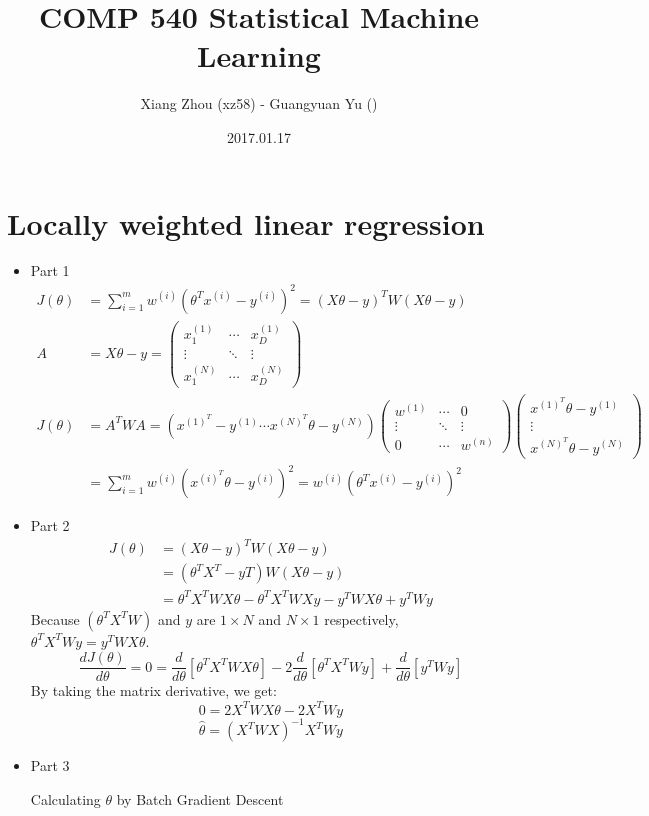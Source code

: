 \documentclass[pdftex,11pt]{article}
\begin{document}
\title{COMP 540 Statistical Machine Learning}
\author{Xiang Zhou (xz58) - Guangyuan Yu ()}
\date{2017.01.17}
\maketitle
\newcommand{\pr}{\mathbb{P}}
\section{Locally weighted linear regression}
\begin{itemize}
\item Part 1 \begin{align*}
	J(\theta)&=\sum^m_{i=1}w^{(i)}(\theta^Tx^{(i)}-y^{(i)})^2=(X\theta-y)^TW(X\theta-y)\\
	A&=X\theta-y=
	\begin{pmatrix}
		x_1^{(1)} & \cdots & x_D^{(1)}\\
		\vdots & \ddots & \vdots\\
		x_1^{(N)} & \cdots & x_D^{(N)}
	\end{pmatrix}\\
	J(\theta)&=A^TWA=(x^{(1)^T}-y^{(1)}\cdots x^{(N)^T}\theta-y^{(N)})
	\begin{pmatrix}
		w^{(1)} & \cdots & 0\\
		\vdots & \ddots & \vdots\\
		0 & \cdots & w^{(n)}
	\end{pmatrix}
	\begin{pmatrix}
		x^{(1)^T}\theta-y^{(1)}\\
		\vdots\\
		x^{(N)^T}\theta-y^{(N)}
	\end{pmatrix}\\
	&=\sum^m_{i=1}w^{(i)}(x^{(i)^T}\theta-y^{(i)})^2=w^{(i)}(\theta^Tx^{(i)}-y^{(i)})^2
	\end{align*}
\item Part 2 \begin{align*}
	J(\theta)&=(X\theta-y)^TW(X\theta-y)\\
	&=(\theta^TX^T-yT)W(X\theta-y)\\
	&=\theta^TX^TWX\theta-\theta^TX^TWXy-y^TWX\theta+y^TWy
	\end{align*}
	Because $(\theta^TX^TW)$ and $y$ are $1\times N$ and $N\times 1$ respectively, $\theta^TX^TWy=y^TWX\theta$.
	$$\frac{dJ(\theta)}{d\theta}=0=\frac{d}{d\theta}[\theta^TX^TWX\theta]-2\frac{d}{d\theta}[\theta^TX^TWy]+\frac{d}{d\theta}[y^TWy]$$
	By taking the matrix derivative, we get:
	$$0=2X^TWX\theta-2X^TWy$$
	$$\hat{\theta}=(X^TWX)^{-1}X^TWy$$
\item Part 3
\begin{algorithm}
  \caption{Calculating $\theta$ by Batch Gradient Descent}


\end{algorithm}
\end{itemize}
\end{document}
